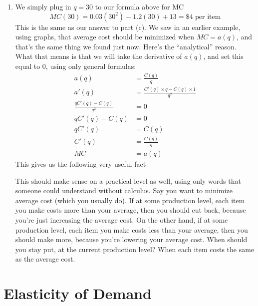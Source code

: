 \documentclass[oneside]{book}
\theoremstyle{definition}
\theoremstyle{solution}
\newtheorem*{solution}{Solution}
\newenvironment{solution}{\vspace{2in}\comment}{\endcomment}
\begin{document}
\begin{solution}
\begin{enumerate}
 \item We simply plug in $q=30$ to our formula above for MC
$$
MC(30) = 0.03(30^2) -1.2(30)+13 = \$4 \text{ per item}
$$
This is the same as our answer to part (c).  We saw in an earlier
example, using graphs, that average cost should be minimized when
$MC = a(q)$, and that's the same thing we found just now.  Here's the
``analytical'' reason.  What that means is that we will take the
derivative of $a(q)$, and set this equal to $0$, using only general
formulas:
\begin{align*}
  a(q) & = \frac{C(q)}{q}\\
  a'(q) & = \frac{C'(q) \times q - C(q)\times 1}{q^2}\\
  \frac{qC'(q) - C(q)}{q^2} & = 0\\
  qC'(q) - C(q) & = 0\\
  qC'(q) & = C(q)\\
  C'(q) & = \frac{C(q)}{q}\\
  MC & = a(q)
\end{align*}
This gives us the following very useful fact
\begin{center}
\end{center}

This should make sense on a practical level as well, using only words
that someone could understand without calculus.  Say you want to
minimize average cost (which you usually do).  If at some production
level, each item you make costs more than your average, then you
should cut back, because you're just increasing the average cost.  On
the other hand, if at some production level, each item you make costs
less than your average, then you should make more, because you're
lowering your average cost.  When should you stay put, at the current
production level?  When each item costs the same as the average cost.
  \end{enumerate}
\end{solution}

\section{Elasticity of Demand}
\end{document}
